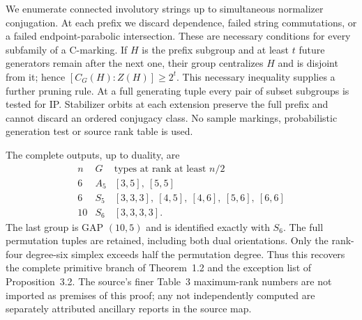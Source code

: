 We enumerate connected involutory strings up to simultaneous normalizer
conjugation. At each prefix we discard dependence, failed string
commutations, or a failed endpoint-parabolic intersection. These are
necessary conditions for every subfamily of a C-marking. If $H$ is the
prefix subgroup and at least $t$ future generators remain after the next
one, their group centralizes $H$ and is disjoint from it; hence
$[C_G(H):Z(H)]\geq2^t$. This necessary inequality supplies a further
pruning rule. At a full generating tuple every pair of subset subgroups
is tested for IP. Stabilizer orbits at each extension preserve the full
prefix and cannot discard an ordered conjugacy class. No sample
markings, probabilistic generation test or source rank table is used.

The complete outputs, up to duality, are
\[
\begin{array}{c|c|l}
 n&G&\text{types at rank at least }n/2\\\hline
6&A_5&[3,5],\ [5,5]\\
6&S_5&[3,3,3],\ [4,5],\ [4,6],\ [5,6],\ [6,6]\\
10&S_6&[3,3,3,3].
\end{array}
\]
The last group is GAP $(10,5)$ and is identified exactly with $S_6$.
The full permutation tuples are retained, including both dual orientations.
Only the rank-four degree-six simplex exceeds half the permutation degree.
Thus this recovers the complete primitive branch of Theorem~1.2 and the
exception list of Proposition~3.2. The source's finer Table~3 maximum-rank
numbers are not imported as premises of this proof; any not independently
computed are separately attributed ancillary reports in the source map.
